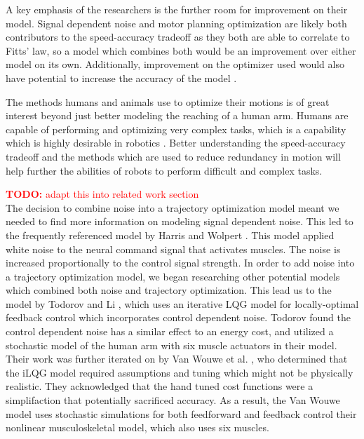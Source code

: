 \documentclass[letterpaper, 10pt, conference]{ieeeconf}
\newcommand{\todo}[1]{\textcolor{red}{\textbf{TODO:} #1}}
\begin{document}
A key emphasis of the researchers is the further room for improvement on their model. Signal dependent noise and motor planning optimization are likely both contributors to the speed-accuracy tradeoff as they both are able to correlate to Fitts’ law, so a model which combines both would be an improvement over either model on its own. Additionally, improvement on the optimizer used would also have potential to increase the accuracy of the model \cite{deep_rl}.

The methods humans and animals use to optimize their motions is of great interest beyond just better modeling the reaching of a human arm. Humans are capable of performing and optimizing very complex tasks, which is a capability which is highly desirable in robotics \cite{biometric_human_arm}. Better understanding the speed-accuracy tradeoff and the methods which are used to reduce redundancy in motion will help further the abilities of robots to perform difficult and complex tasks.

\todo{adapt this into related work section} \\
The decision to combine noise into a trajectory optimization model meant we needed to find more information on modeling signal dependent noise. This led to the frequently referenced model by Harris and Wolpert \cite{signal_dependent_motor_noise}. This model applied white noise to the neural command signal that activates muscles. The noise is increased proportionally to the control signal strength. In order to add noise into a trajectory optimization model, we began researching other potential models which combined both noise and trajectory optimization. This lead us to the model by Todorov and Li \cite{ilqg}, which uses an iterative LQG model for locally-optimal feedback control which incorporates control dependent noise. Todorov found the control dependent noise has a similar effect to an energy cost, and utilized a stochastic model of the human arm with six muscle actuators in their model. Their work was further iterated on by Van Wouwe et al. \cite{stochastic_model}, who determined that the iLQG model required assumptions and tuning which might not be physically realistic. They acknowledged that the hand tuned cost functions were a simplifaction that potentially sacrificed accuracy. As a result, the Van Wouwe model uses stochastic simulations for both feedforward and feedback control their nonlinear musculoskeletal model, which also uses six muscles. 
\end{document}
